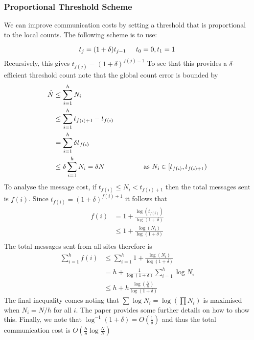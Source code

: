 \documentclass{article}
\begin{document}
\subsubsection*{Proportional Threshold Scheme}

We can improve communication costs by setting a threshold that is proportional to the local counts. The following scheme is to use: 

$$t_j = (1+\delta)t_{j-1} \hspace{5mm} t_0 = 0, t_1 =1 $$
Recursively, this gives $t_{f(j)} = (1+\delta)^{f(j)-1}$ To see that this provides a $\delta$-efficient threshold count note that the global count error is bounded by 
\begin{align*}
    \hat{N} &\leq \sum_{i=1}^{h}N_i \\
            &\leq \sum_{i=1}^{h} t_{f(i)+1} - t_{f(i)}\\
            &=\sum_{i=1}^{h} \delta t_{f(i)} \\
            &\leq \delta \sum_{i=1}^{h}N_i = \delta N \hspace{20mm} \text{as $N_i\in [t_{f(i)}, t_{f(i)+1})$}
\end{align*}
To analyse the message cost, if $t_{f(i)}\leq N_i < t_{f(i)+1}$
then the total messages sent is $f(i)$. Since $t_{f(i)} = (1+\delta)^{f(i)+1}$ it follows that 
\begin{align*}
    f(i) &= 1 + \frac{\log (t_{f(i)})}{\log(1+\delta)} \\
         &\leq 1 + \frac{\log (N_i)}{\log(1+\delta)} \\
\end{align*}
The total messages sent from all sites therefore is 
\begin{align*}
    \sum_{i=1}^{h} f(i) &\leq \sum_{i=1}^{h}1 + \frac{\log (N_i)}{\log(1+\delta)} \\
    &= h + \frac{1}{\log(1+\delta)}\sum_{i=1}^{h}\log N_i \\
    &\leq h + h\frac{\log(\frac{N}{h})}{\log(1+\delta)}
\end{align*}
The final inequality comes noting that $\sum \log N_i = \log(\prod N_i)$ is maximised when $N_i = N/h$ for all $i$. The paper provides some further details on how to show this. Finally, we note that $\log^{-1}(1+\delta) = O(\frac{1}{\delta})$ and thus the total communication cost is $O(\frac{h}{\delta}\log\frac{N}{h})$
\end{document}
